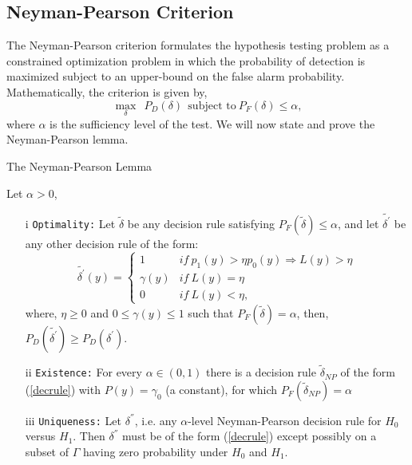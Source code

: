 \documentclass[a4paper,english,12pt]{article}
\begin{document}
\subsection{Neyman-Pearson Criterion}
The Neyman-Pearson criterion formulates the hypothesis testing problem as a constrained optimization problem in which the probability of detection is maximized subject to an upper-bound on the false alarm probability. Mathematically, the criterion is given by,
\begin{equation}
\underset{\delta}{\max}~~P_{D} (\delta)~~ \mbox{subject to}~P_F(\delta) \le \alpha,
\end{equation}
where $\alpha$ is the sufficiency level of the test. We will now state and prove the Neyman-Pearson lemma.
\begin{lem}{The Neyman-Pearson Lemma}
\par Let $\alpha > 0$, 
\begin{itemize}
\item[i] \texttt{Optimality:} Let $\tilde{\delta}$ be any decision rule satisfying $P_F(\tilde{\delta}) \le \alpha$, and let $\tilde{\delta^{'}}$ be any other decision rule of the form:
\begin{equation}
\label{decrule}
\tilde{\delta^{'}} (y) = 
\begin{cases}
1 &if~p_{1}(y) > \eta p_0 (y) \Rightarrow L(y) > \eta\\
\gamma(y) &if~L(y) = \eta\\
0 &if~L(y) < \eta,
\end{cases}
\end{equation}
where, $\eta \geq 0$ and $0 \leq \gamma(y) \leq 1$ such that $P_F(\tilde{\delta}) = \alpha$, then, $P_D(\tilde{\delta^{'}}) \geq P_D(\delta^{'})$.
\item[ii] \texttt{Existence:} For every $\alpha \in (0,1)$ there is a decision rule $\tilde{\delta}_{NP}$ of the form (\ref{decrule}) with $P(y) = \gamma_0$ (a constant), for which $P_F(\tilde{\delta}_{NP}) = \alpha$
\item[iii] \texttt{Uniqueness:} Let $\delta^{''}$, i.e. any $\alpha$-level Neyman-Pearson decision rule for $H_0$ versus $H_1$. Then $\delta^{''}$ must be of the form (\ref{decrule}) except possibly on a subset of $\Gamma$ having zero probability under $H_0$ and $H_1$.
\end{itemize}
\end{lem}
\end{document}
